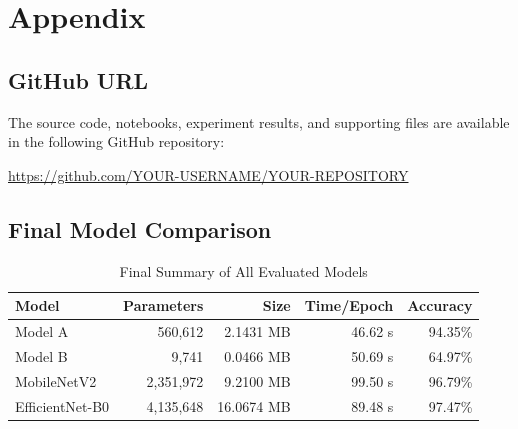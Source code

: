\documentclass[12pt,a4paper]{report}
\begin{document}

\appendix

\chapter{Appendix}

\section{GitHub URL}

The source code, notebooks, experiment results, and supporting
files are available in the following GitHub repository:

\begin{center}

\url{https://github.com/YOUR-USERNAME/YOUR-REPOSITORY}

\end{center}



\section{Final Model Comparison}

\begin{table}[H]
\centering
\caption{Final Summary of All Evaluated Models}
\label{tab:final_summary}

\begin{tabular}{lrrrr}
\toprule
\textbf{Model}
&
\textbf{Parameters}
&
\textbf{Size}
&
\textbf{Time/Epoch}
&
\textbf{Accuracy}
\\
\midrule

Model A
&
560,612
&
2.1431 MB
&
46.62 s
&
94.35\%
\\

Model B
&
9,741
&
0.0466 MB
&
50.69 s
&
64.97\%
\\

MobileNetV2
&
2,351,972
&
9.2100 MB
&
99.50 s
&
96.79\%
\\

EfficientNet-B0
&
4,135,648
&
16.0674 MB
&
89.48 s
&
97.47\%
\\

\bottomrule
\end{tabular}

\end{table}



\end{document}
